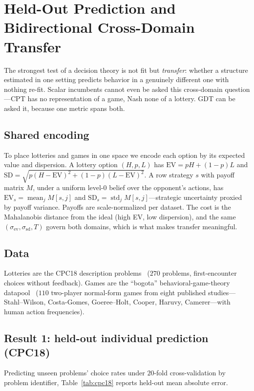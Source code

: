 \documentclass[journal]{IEEEtran}
\begin{document}
\section{Held-Out Prediction and Bidirectional Cross-Domain Transfer}
\label{sec:transfer}

The strongest test of a decision theory is not fit but \emph{transfer}: whether a structure estimated in one setting predicts behavior in a genuinely different one with nothing re-fit.
Scalar incumbents cannot even be asked this cross-domain question---CPT has no representation of a game, Nash none of a lottery.
GDT can be asked it, because one metric spans both.

\subsection{Shared encoding}
To place lotteries and games in one space we encode each option by its expected value and dispersion.
A lottery option $(H,p,L)$ has $\mathrm{EV}=pH+(1-p)L$ and $\mathrm{SD}=\sqrt{p(H-\mathrm{EV})^2+(1-p)(L-\mathrm{EV})^2}$.
A row strategy $s$ with payoff matrix $M$, under a uniform level-$0$ belief over the opponent's actions, has $\mathrm{EV}_s=\operatorname{mean}_j M[s,j]$ and $\mathrm{SD}_s=\operatorname{std}_j M[s,j]$---strategic uncertainty proxied by payoff variance.
Payoffs are scale-normalized per dataset.
The cost is the Mahalanobis distance from the ideal (high EV, low dispersion), and the same $(\sigma_{\mathrm{ev}},\sigma_{\mathrm{sd}},T)$ govern both domains, which is what makes transfer meaningful.

\subsection{Data}
Lotteries are the CPC18 description problems~\cite{erev2017,cpc18data} ($270$ problems, first-encounter choices without feedback).
Games are the ``bogota'' behavioral-game-theory datapool~\cite{wright2017} ($110$ two-player normal-form games from eight published studies---Stahl--Wilson, Costa-Gomes, Goeree--Holt, Cooper, Haruvy, Camerer---with human action frequencies).

\subsection{Result 1: held-out individual prediction (CPC18)}
Predicting unseen problems' choice rates under $20$-fold cross-validation by problem identifier, Table~\ref{tab:cpc18} reports held-out mean absolute error.
\end{document}
